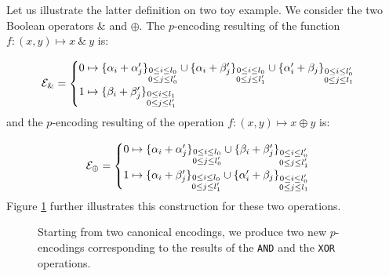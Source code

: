 Let us illustrate the latter definition on two toy example. We consider the two Boolean operators $\&$ and $\oplus$. The $p$-encoding resulting of the function $f: (x, y) \mapsto x ~\&~ y$ is: 

\begin{equation}
\mathcal{E}_\& = \begin{cases}
0 \mapsto \{\alpha_i + \alpha'_j\}_{\substack{0\le i \le l_0 \\ 0 \le j \le l_0'}} \cup \{\alpha_i + \beta'_j\}_{\substack{0 \le i \le l_0 \\ 0 \le j \le l'_1}} \cup \{\alpha'_i + \beta_j\}_{\substack{0 \le i \le l'_0 \\ 0 \le j \le l_1}}\\
1 \mapsto \{\beta_i + \beta'_j\}_{\substack{0\le i \le l_1 \\ 0 \le j \le l_1'}}
\end{cases}
\label{eq:encoding_and}
\end{equation}
and the $p$-encoding resulting of the operation $f: (x, y) \mapsto x \oplus y$ is:

\begin{equation}
\mathcal{E}_\oplus = \begin{cases}
0 \mapsto \{\alpha_i + \alpha'_j\}_{\substack{0\le i \le l_0 \\ 0 \le j \le l_0'}} \cup \{\beta_i + \beta'_j\}_{\substack{0 \le i \le l'_0 \\ 0 \le j \le l'_1}}\\
1 \mapsto \{\alpha_i + \beta'_j\}_{\substack{0\le i \le l_0 \\ 0 \le j \le l_1'}} \cup \{\alpha'_i + \beta_j\}_{\substack{0\le i \le l_0' \\ 0 \le j \le l_1}} \\
\end{cases}
\label{eq:encoding_xor}
\end{equation}
%
Figure \ref{fig:operations} further illustrates this construction for these two operations.

\begin{figure}
	\centering
	\caption{Starting from two canonical encodings, we produce two new $p$-encodings corresponding to the results of the \texttt{AND} and the \texttt{XOR} operations.}
	\label{fig:operations}
\end{figure}



